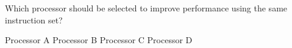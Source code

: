 \documentclass{exam}
\begin{document}
\begin{questions}
        Which processor should be selected to improve performance using the same instruction set? 
        
		\begin{choices}
			\choice Processor A
			\choice Processor B
			\choice Processor C
			\CorrectChoice Processor D
		\end{choices}%

    
\end{questions}
\end{document}
